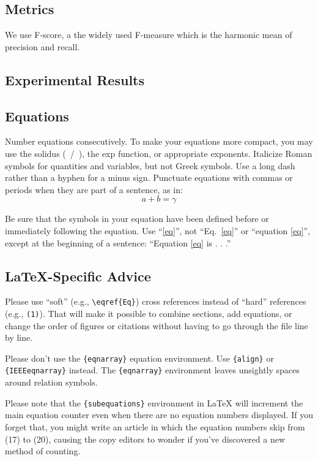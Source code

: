 \documentclass[conference]{IEEEtran}
\begin{document}
\subsection{Metrics}
We use F-score, a the widely used F-measure which is the harmonic mean of precision and recall.
\subsection{Experimental Results}
\subsection{}


\subsection{Equations}
Number equations consecutively. To make your 
equations more compact, you may use the solidus (~/~), the exp function, or 
appropriate exponents. Italicize Roman symbols for quantities and variables, 
but not Greek symbols. Use a long dash rather than a hyphen for a minus 
sign. Punctuate equations with commas or periods when they are part of a 
sentence, as in:
\begin{equation}
a+b=\gamma\label{eq}
\end{equation}

Be sure that the 
symbols in your equation have been defined before or immediately following 
the equation. Use ``\eqref{eq}'', not ``Eq.~\eqref{eq}'' or ``equation \eqref{eq}'', except at 
the beginning of a sentence: ``Equation \eqref{eq} is . . .''

\subsection{\LaTeX-Specific Advice}

Please use ``soft'' (e.g., \verb|\eqref{Eq}|) cross references instead
of ``hard'' references (e.g., \verb|(1)|). That will make it possible
to combine sections, add equations, or change the order of figures or
citations without having to go through the file line by line.

Please don't use the \verb|{eqnarray}| equation environment. Use
\verb|{align}| or \verb|{IEEEeqnarray}| instead. The \verb|{eqnarray}|
environment leaves unsightly spaces around relation symbols.

Please note that the \verb|{subequations}| environment in {\LaTeX}
will increment the main equation counter even when there are no
equation numbers displayed. If you forget that, you might write an
article in which the equation numbers skip from (17) to (20), causing
the copy editors to wonder if you've discovered a new method of
counting.
\end{document}
